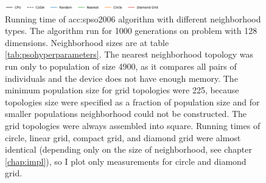 \begin{figure}[ht!]
    \begin{minipage}{\textwidth}
        \centering
        \includegraphics[width=0.6\textwidth]{img/runs/time_pso_neigh_legend.pdf}
    \end{minipage}

    \caption[PSO2006 neighborhood running time]{Running time of \acrlong{acc:spso2006} algorithm with different neighborhood types. The algorithm run for 1000 generations on problem with 128 dimensions. Neighborhood sizes are at table \ref{tab:psohyperparameters}. The nearest neighborhood topology was run only to population of size 4900, as it compares all pairs of individuals and the device does not have enough memory. The minimum population size for grid topologies were 225, because topologies size were specified as a fraction of population size and for smaller populations neighborhood could not be constructed. The grid topologies were always assembled into square. Running times of circle, linear grid, compact grid, and diamond grid were almost identical (depending only on the size of neighborhood, see chapter \ref{chap:impl}), so I plot only measurements for circle and diamond grid.}
\end{figure}



